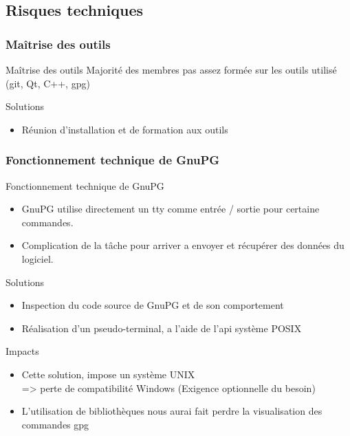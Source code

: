   \subsection{Risques techniques}
    \begin{frame}
      \frametitle{\color{white}Maîtrise des outils}
      \begin{block}{Maîtrise des outils}
        Majorité des membres pas assez formée sur les outils utilisé\\
        (git, Qt, C++, gpg)
      \end{block}
      \pause
      \begin{exampleblock}{Solutions}
        \begin{itemize}
          \item Réunion d'installation et de formation aux outils
        \end{itemize}
      \end{exampleblock}
    \end{frame}
    \begin{frame}
      \frametitle{\color{white}Fonctionnement technique de GnuPG}
      \begin{block}{Fonctionnement technique de GnuPG}
        \begin{itemize}
          \item GnuPG utilise directement un tty comme entrée / sortie pour certaine commandes.
          \item Complication de la tâche pour arriver a envoyer et récupérer des données du logiciel.
        \end{itemize}
        
      \end{block}
      \pause
      \begin{exampleblock}{Solutions}
        \begin{itemize}
          \item Inspection du code source de GnuPG et de son comportement
          \item Réalisation d'un pseudo-terminal, a l'aide de l'api système POSIX
        \end{itemize}
      \end{exampleblock}
      \pause
      \begin{alertblock}{Impacts}
        \begin{itemize}
          \item Cette solution, impose un système UNIX \\
                => perte de compatibilité Windows (Exigence optionnelle du besoin)
          \item L'utilisation de bibliothèques nous aurai fait perdre
          la visualisation des commandes gpg
        \end{itemize}
      \end{alertblock}
    \end{frame}

